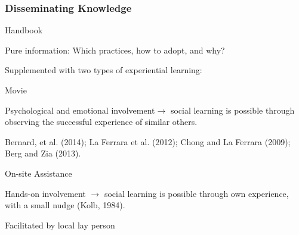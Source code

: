 \documentclass[hideothersubsections, usenames,dvipsnames,10pt]{beamer}
\newenvironment{itemize_3pt}{\itemize\addtolength{\itemsep}{3pt}}{\enditemize}
\begin{document}
%
\begin{frame}
\frametitle{Disseminating Knowledge}
		\begin{itemize_3pt}
		\item \textcolor{bdf}{Handbook}
			\begin{itemize_3pt}
			\item \textcolor{bdf}{Pure information}: Which practices, how to adopt, and why?\\
			\end{itemize_3pt}
\bigskip
Supplemented with two types of experiential learning:
\bigskip
		\item \textcolor{bdf}{Movie}
			\begin{itemize_3pt}
			\item \textcolor{bdf}{Psychological and emotional involvement}$\rightarrow$ social learning is possible through \textcolor{bdf}{observing the successful experience of similar others}.
			\item Bernard, et al. (2014); La Ferrara et al. (2012); Chong and La Ferrara (2009); Berg and Zia (2013).\\
			\end{itemize_3pt}

\bigskip
		\item \textcolor{bdf}{On-site Assistance}
			\begin{itemize_3pt}
			\item \textcolor{bdf}{Hands-on involvement} $\rightarrow$ social learning is possible through own \textcolor{bdf}{experience, with a small nudge} (Kolb, 1984).
			\item Facilitated by local lay person
			\end{itemize_3pt}
			\vspace{0.05in}
		\end{itemize_3pt}

\end{frame}
\end{document}
